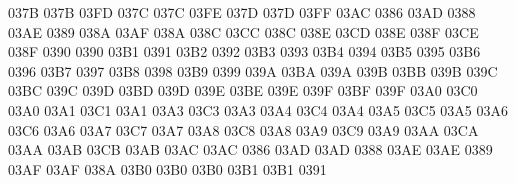 \setcclcucx 037B 037B 03FD %
\setcclcucx 037C 037C 03FE %
\setcclcucx 037D 037D 03FF %
 03AC 0386 %
 03AD 0388 %
 03AE 0389 %
\setcclcucx 038A 03AF 038A %
\setcclcucx 038C 03CC 038C %
\setcclcucx 038E 03CD 038E %
\setcclcucx 038F 03CE 038F %
 0390 0390 %
 03B1 0391 %
 03B2 0392 %
 03B3 0393 %
 03B4 0394 %
 03B5 0395 %
 03B6 0396 %
 03B7 0397 %
 03B8 0398 %
 03B9 0399 %
\setcclcucx 039A 03BA 039A %
\setcclcucx 039B 03BB 039B %
\setcclcucx 039C 03BC 039C %
\setcclcucx 039D 03BD 039D %
\setcclcucx 039E 03BE 039E %
\setcclcucx 039F 03BF 039F %
\setcclcucx 03A0 03C0 03A0 %
\setcclcucx 03A1 03C1 03A1 %
\setcclcucx 03A3 03C3 03A3 %
\setcclcucx 03A4 03C4 03A4 %
\setcclcucx 03A5 03C5 03A5 %
\setcclcucx 03A6 03C6 03A6 %
\setcclcucx 03A7 03C7 03A7 %
\setcclcucx 03A8 03C8 03A8 %
\setcclcucx 03A9 03C9 03A9 %
\setcclcucx 03AA 03CA 03AA %
\setcclcucx 03AB 03CB 03AB %
\setcclcucx 03AC 03AC 0386 %
\setcclcucx 03AD 03AD 0388 %
\setcclcucx 03AE 03AE 0389 %
\setcclcucx 03AF 03AF 038A %
\setcclcucx 03B0 03B0 03B0 %
\setcclcucx 03B1 03B1 0391 %
